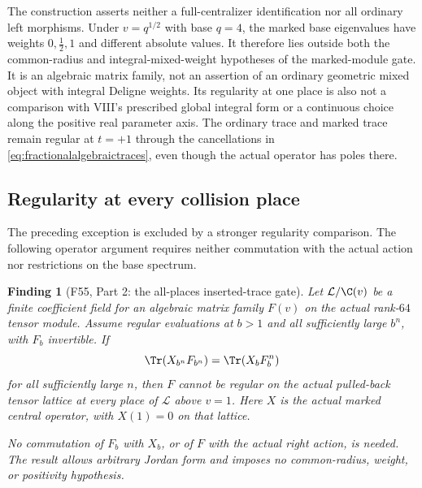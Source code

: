 \documentclass[11pt,a4paper]{article}
\newcommand{\fid}[1]{\textsf{#1}}\newcommand{\gate}[1]{\textsf{#1}}
\theoremstyle{named}\newtheorem{finding}{Finding}[section]
\theoremstyle{definition}\newtheorem{definition}[finding]{Definition}
\theoremstyle{remark}\newtheorem{remark}[finding]{Remark}
\begin{document}
The construction asserts neither a full-centralizer
identification nor all ordinary left morphisms.
Under $v=q^{1/2}$ with base $q=4$, the marked base
eigenvalues have weights $0,\tfrac12,1$ and different
absolute values. It therefore lies outside both the
common-radius and integral-mixed-weight hypotheses
of the marked-module gate.
It is an algebraic matrix family, not an assertion
of an ordinary geometric mixed object with integral
Deligne weights.
Its regularity at one place is also not a comparison
with VIII's prescribed global integral form or a
continuous choice along the positive real parameter
axis. The ordinary trace and marked trace remain
regular at $t=+1$ through the cancellations in
\eqref{eq:fractionalalgebraictraces}, even though the
actual operator has poles there.

\subsection{Regularity at every collision place}
The preceding exception is excluded by a stronger
regularity comparison. The following operator argument
requires neither commutation with the actual action
nor restrictions on the base spectrum.

\begin{finding}[\fid{F55}, Part 2: the all-places inserted-trace gate]
\label{f:allplacestrace}
Let $\mathcal L/\C(v)$ be a finite coefficient field
for an algebraic matrix family $F(v)$ on the actual
rank-$64$ tensor module.
Assume regular evaluations at $b>1$ and all
sufficiently large $b^n$, with $F_b$ invertible.
If
\[
 \Tr(X_{b^n}F_{b^n})=\Tr(X_bF_b^n)
\]
for all sufficiently large $n$, then $F$ cannot be
regular on the actual pulled-back tensor lattice
at every place of $\mathcal L$ above $v=1$.
Here $X$ is the actual marked central operator,
with $X(1)=0$ on that lattice.

No commutation of $F_b$ with $X_b$, or of $F$ with
the actual right action, is needed.
The result allows arbitrary Jordan form and imposes
no common-radius, weight, or positivity hypothesis.
\end{finding}
\end{document}
